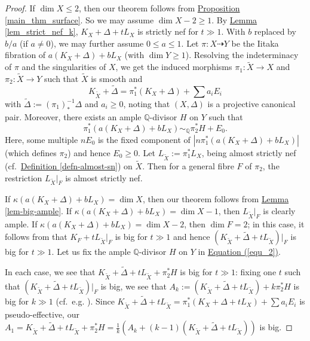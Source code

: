 \begin{proof}
If $\dim X\leqslant 2$, then our theorem follows from {\hyperref[main_thm_surface]{Proposition \ref*{main_thm_surface}}}.
So we may assume $\dim X-2\geqslant 1$.
By {\hyperref[lem_strict_nef_k]{Lemma  \ref*{lem_strict_nef_k}}}, $K_X+\Delta+tL_X$ is strictly nef for $t\gg 1$. 
With $b$ replaced by $b/a$ (if $a\neq 0$), we may further assume  $0\leqslant a\leqslant 1$.
Let $\pi:X\dashrightarrow Y$ be the Iitaka fibration of $a(K_X+\Delta)+bL_X$ (with $\dim Y\geqslant 1$).
Resolving the indeterminacy of $\pi$ and the singularities of $X$, we get the induced morphisms $\pi_1:\widetilde{X}\to X$ and $\pi_2:\widetilde{X}\to Y$ such that  $\widetilde{X}$ is smooth and
\begin{equation}\label{equ_1}
	K_{\widetilde{X}}+\widetilde{\Delta}=\pi_1^*(K_X+\Delta)+\sum a_iE_i
\end{equation}
with $\widetilde{\Delta}:=(\pi_1)_*^{-1}\Delta$ and $a_i\geqslant 0$, noting that $(X,\Delta)$ is a projective canonical pair.
Moreover, there exists an ample $\mathbb{Q}$-divisor $H$ on $Y$ such that
\begin{equation}\label{equ_2}
\pi_1^*(a(K_X+\Delta)+bL_X)\sim_{\mathbb{Q}}\pi_2^*H+E_0.	
\end{equation}
Here, some multiple $nE_0$ is the fixed component of $|n\pi_1^*(a(K_X+\Delta)+bL_X)|$ (which defines $\pi_2$) and hence $E_0\ge 0$. 
Let $L_{\widetilde{X}}:=\pi_1^*L_X$, being almost strictly nef (cf.~{\hyperref[defn-almost-sn]{Definition \ref*{defn-almost-sn}}}) 
on $\widetilde{X}$.
Then for a general fibre $F$ of $\pi_2$, the restriction $L_{\widetilde{X}}|_F$ is almost strictly nef.


If $\kappa(a(K_X+\Delta)+bL_X)=\dim X$, then our theorem follows from {\hyperref[lem-big-ample]{Lemma  \ref*{lem-big-ample}}}.
If $\kappa(a(K_X+\Delta)+bL_X)=\dim X-1$, then  $L_{\widetilde{X}}|_F$ is clearly ample.
If $\kappa(a(K_X+\Delta)+bL_X)=\dim X-2$, then $\dim F=2$; in this case, it follows from \cite[Theorem 26]{Cha20} that $K_F+tL_{\widetilde{X}}|_F$ is big for $t\gg 1$ and hence $(K_{\widetilde{X}}+\widetilde{\Delta}+tL_{\widetilde{X}})|_{F}$ is big for $t\gg 1$.
Let us fix the ample $\mathbb{Q}$-divisor $H$ on $Y$ in {\hyperref[equ_2]{Equation  (\ref*{equ_2})}}.

In each case, we see that 
$K_{\widetilde{X}}+\widetilde{\Delta}+tL_{\widetilde{X}}+\pi_2^*H$
is big for $t\gg 1$: fixing one $t$ such that $(K_{\widetilde{X}}+\widetilde{\Delta}+tL_{\widetilde{X}})|_{F}$ is big, we see that  $A_k:=(K_{\widetilde{X}}+\widetilde{\Delta}+tL_{\widetilde{X}})+k\pi_2^*H$ is big for $k\gg 1$ (cf.~e.g. \cite[Lemma 3.23]{KM98}).
Since $K_{\widetilde{X}}+\widetilde{\Delta}+tL_{\widetilde{X}}=\pi_1^*(K_X+\Delta+tL_X)+\sum a_iE_i$ is   pseudo-effective, our $A_1=K_{\widetilde{X}}+\widetilde{\Delta}+tL_{\widetilde{X}}+\pi_2^*H=\frac{1}{k}(A_k+(k-1)(K_{\widetilde{X}}+\widetilde{\Delta}+tL_{\widetilde{X}}))$ is big.


\end{proof}

